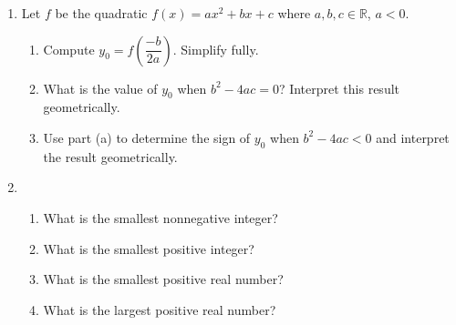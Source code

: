 \documentclass[12 pt]{article}
\begin{document}
\begin{enumerate}[resume, leftmargin=-0.25in, rightmargin=-0.25in]
\item Let $f$ be the quadratic $f(x)=ax^2+bx+c$ where $a,b,c\in\mathbb{R}$, $a<0$.
\begin{enumerate}
\item Compute $y_0=f\left(\dfrac{-b}{2a}\right)$. Simplify fully.\vspace{0.375in}
\item What is the value of $y_0$ when $b^2-4ac=0$? Interpret this result geometrically.\vspace{0.5in}
\item Use part (a) to determine the sign of $y_0$ when $b^2-4ac<0$ and interpret the result geometrically.
\end{enumerate}\vspace{0.5in}

\item\begin{enumerate}
	\item What is the smallest nonnegative integer?\vspace{1.5mm}
	\item What is the smallest positive integer?\vspace{1.5mm}
	\item What is the smallest positive real number?\vspace{1.5mm}
	\item What is the largest positive real number?
\end{enumerate}

\newpage


\end{enumerate}
\end{document}

